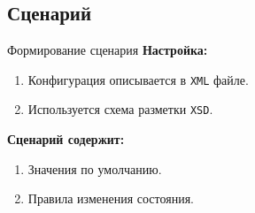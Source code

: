 \subsection{Сценарий}
\begin{frame}{Формирование сценария}
    \textbf{Настройка:}
    \begin{enumerate}
        \item Конфигурация описывается в \texttt{XML} файле.
        \item Используется схема разметки \texttt{XSD}.
    \end{enumerate}
    \textbf{Сценарий содержит:}
    \begin{enumerate}
        \item Значения по умолчанию.
        \item Правила изменения состояния.
    \end{enumerate}
\end{frame}